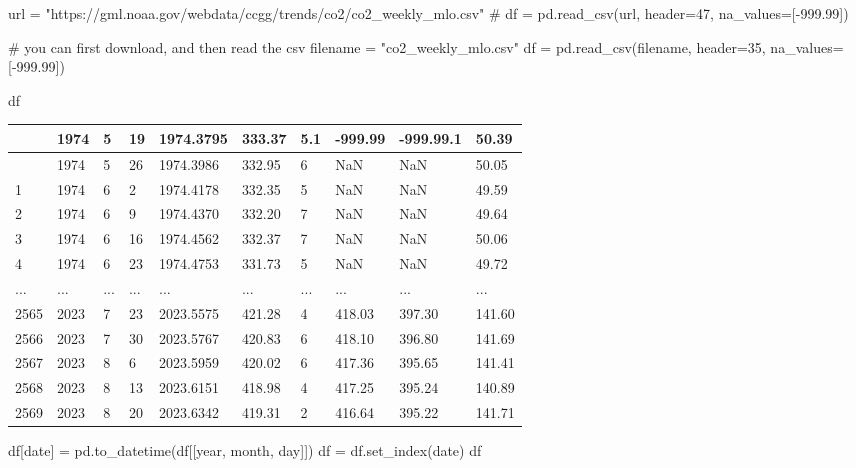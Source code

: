 \documentclass[
  letterpaper,
  DIV=11,
  numbers=noendperiod,
  oneside]{scrreprt}
\newenvironment{Shaded}{\begin{snugshade}}{\end{snugshade}}
\newcommand{\CommentTok}[1]{\textcolor[rgb]{0.37,0.37,0.37}{#1}}
\newcommand{\DecValTok}[1]{\textcolor[rgb]{0.68,0.00,0.00}{#1}}
\newcommand{\FloatTok}[1]{\textcolor[rgb]{0.68,0.00,0.00}{#1}}
\newcommand{\NormalTok}[1]{\textcolor[rgb]{0.00,0.23,0.31}{#1}}
\newcommand{\OperatorTok}[1]{\textcolor[rgb]{0.37,0.37,0.37}{#1}}
\newcommand{\StringTok}[1]{\textcolor[rgb]{0.13,0.47,0.30}{#1}}
\begin{document}
\begin{Shaded}
\begin{Highlighting}[]
\NormalTok{url }\OperatorTok{=} \StringTok{"https://gml.noaa.gov/webdata/ccgg/trends/co2/co2\_weekly\_mlo.csv"}
\CommentTok{\# df = pd.read\_csv(url, header=47, na\_values=[{-}999.99])}

\CommentTok{\# you can first download, and then read the csv}
\NormalTok{filename }\OperatorTok{=} \StringTok{"co2\_weekly\_mlo.csv"}
\NormalTok{df }\OperatorTok{=}\NormalTok{ pd.read\_csv(filename, header}\OperatorTok{=}\DecValTok{35}\NormalTok{, na\_values}\OperatorTok{=}\NormalTok{[}\OperatorTok{{-}}\FloatTok{999.99}\NormalTok{])}

\NormalTok{df}
\end{Highlighting}
\end{Shaded}

\begin{longtable}[]{@{}llllllllll@{}}
\toprule\noalign{}
& 1974 & 5 & 19 & 1974.3795 & 333.37 & 5.1 & -999.99 & -999.99.1 &
50.39 \\
\midrule\noalign{}
\endhead
\bottomrule\noalign{}
\endlastfoot
0 & 1974 & 5 & 26 & 1974.3986 & 332.95 & 6 & NaN & NaN & 50.05 \\
1 & 1974 & 6 & 2 & 1974.4178 & 332.35 & 5 & NaN & NaN & 49.59 \\
2 & 1974 & 6 & 9 & 1974.4370 & 332.20 & 7 & NaN & NaN & 49.64 \\
3 & 1974 & 6 & 16 & 1974.4562 & 332.37 & 7 & NaN & NaN & 50.06 \\
4 & 1974 & 6 & 23 & 1974.4753 & 331.73 & 5 & NaN & NaN & 49.72 \\
... & ... & ... & ... & ... & ... & ... & ... & ... & ... \\
2565 & 2023 & 7 & 23 & 2023.5575 & 421.28 & 4 & 418.03 & 397.30 &
141.60 \\
2566 & 2023 & 7 & 30 & 2023.5767 & 420.83 & 6 & 418.10 & 396.80 &
141.69 \\
2567 & 2023 & 8 & 6 & 2023.5959 & 420.02 & 6 & 417.36 & 395.65 &
141.41 \\
2568 & 2023 & 8 & 13 & 2023.6151 & 418.98 & 4 & 417.25 & 395.24 &
140.89 \\
2569 & 2023 & 8 & 20 & 2023.6342 & 419.31 & 2 & 416.64 & 395.22 &
141.71 \\
\end{longtable}

\begin{Shaded}
\begin{Highlighting}[]
\NormalTok{df[}\StringTok{\textquotesingle{}date\textquotesingle{}}\NormalTok{] }\OperatorTok{=}\NormalTok{ pd.to\_datetime(df[[}\StringTok{\textquotesingle{}year\textquotesingle{}}\NormalTok{, }\StringTok{\textquotesingle{}month\textquotesingle{}}\NormalTok{, }\StringTok{\textquotesingle{}day\textquotesingle{}}\NormalTok{]])}
\NormalTok{df }\OperatorTok{=}\NormalTok{ df.set\_index(}\StringTok{\textquotesingle{}date\textquotesingle{}}\NormalTok{)}
\NormalTok{df}
\end{Highlighting}
\end{Shaded}
\end{document}
